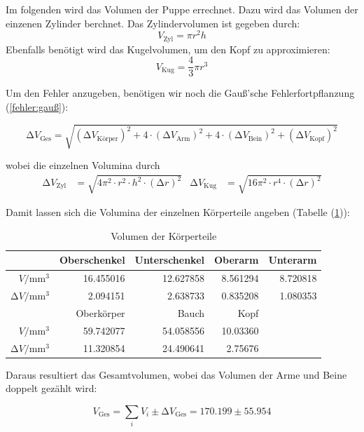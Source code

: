 Im folgenden wird das Volumen der Puppe errechnet.
Dazu wird das Volumen der einzenen Zylinder berchnet.
Das Zylindervolumen ist gegeben durch:
\begin{equation*}
  V_{\text{Zyl}} = \pi r^2 h
\end{equation*}
Ebenfalls benötigt wird das Kugelvolumen, um den Kopf zu approximieren:
\begin{equation*}
  V_{\text{Kug}} = \frac{4}{3} \pi r^3
\end{equation*}

Um den Fehler anzugeben, benötigen wir noch die Gauß'sche Fehlerfortpflanzung (\ref{fehler:gauß}):

\begin{equation}
  \increment V_{\text{Ges}} = \sqrt{(\increment V_{\text{Körper}})^2 + 4 \cdot (\increment V_{\text{Arm}})^2 
    + 4 \cdot (\increment V_{\text{Bein}})^2 + (\increment V_{\text{Kopf}})^2}
\end{equation}

wobei die einzelnen Volumina durch 
\begin{align*}
  \increment V_{\text{Zyl}} &= \sqrt{4 \pi^2 \cdot r^2 \cdot h^2 \cdot (\increment r)^2} & 
  \increment V_{\text{Kug}} &= \sqrt{16 \pi^2 \cdot r^4 \cdot (\increment r)^2}
\end{align*}

Damit lassen sich die Volumina der einzelnen Körperteile angeben (Tabelle (\ref{tab:VolGlieder})):

\begin{table}[H]
  \centering
  \caption{Volumen der Körperteile}
  \label{tab:VolGlieder}
  \begin{tabular}{rrrrr}
    \toprule
    & Oberschenkel &     Unterschenkel &     Oberarm &     Unterarm \\
    \midrule
    $V / \unit{\milli\cubic\meter}$  & 16.455016 & 12.627858 & 8.561294 & 8.720818 \\
    $\increment V / \unit{\milli\cubic\meter}$  &   2.094151 &  2.638733 & 0.835208 & 1.080353  \\
    \midrule
    &    Oberkörper &     Bauch & Kopf & \\
    \midrule
    $V / \unit{\milli\cubic\meter}$  & 59.742077 & 54.058556 & 10.03360 & \\ 
    $\increment V / \unit{\milli\cubic\meter}$  &  11.320854 & 24.490641 & 2.75676 & \\
    \bottomrule
    \end{tabular}
\end{table}

Daraus resultiert das Gesamtvolumen, wobei das Volumen der Arme und Beine doppelt gezählt wird:

\begin{equation*}
  V_{\text{Ges}} = \sum_i V_{i} \pm  \increment V_{\text{Ges}}= 170.199 \pm 55.954
\end{equation*}